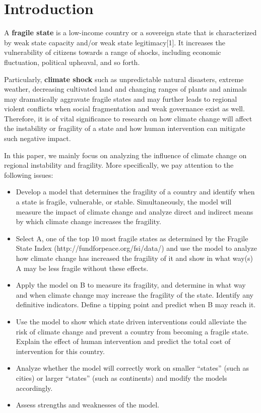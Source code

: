 \documentclass{mcmthesis}
\begin{document}
\newpage
\begin{center}
	\tableofcontents
	\setcounter{page}{0}
	\thispagestyle{empty}
\end{center}
\newpage

\section{Introduction}

A \textbf{fragile state} is a low-income country or a sovereign state that is characterized by weak state capacity and/or weak state legitimacy[1]. It increases the vulnerability of citizens towards a range of shocks, including economic fluctuation, political upheaval, and so forth. 

Particularly, \textbf{climate shock} such as unpredictable natural disasters, extreme weather, decreasing cultivated land and changing ranges of plants and animals may dramatically aggravate fragile states and may further leads to regional violent conflicts when social fragmentation and weak governance exist as well. Therefore, it is of vital significance to research on how climate change will affect the instability or fragility of a state and how human intervention can mitigate such negative impact.

In this paper, we mainly focus on analyzing the influence of climate change on regional instability and fragility. More specifically, we pay attention to the following issues:
\begin{itemize}
	\item Develop a model that determines the fragility of a country and identify when a state is fragile, vulnerable, or stable. Simultaneously, the model will measure the impact of climate change and analyze direct and indirect means by which climate change increases the fragility.
	\item Select A, one of the top 10 most fragile states as determined by the Fragile State Index (http://fundforpeace.org/fsi/data/) and use the model to analyze how climate change has increased the fragility of it and show in what way(s) A may be less fragile without these effects.
	\item Apply the model on B to measure its fragility, and determine in what way and when climate change may increase the fragility of the state. Identify any definitive indicators. Define a tipping point and predict when B may reach it.
	\item Use the model to show which state driven interventions could alleviate the risk of climate change and prevent a country from becoming a fragile state. Explain the effect of human intervention and predict the total cost of intervention for this country.
	\item Analyze whether the model will correctly work on smaller “states” (such as cities) or larger “states” (such as continents) and modify the models accordingly.
	\item Assess strengths and weaknesses of the model.
\end{itemize}
\end{document}
